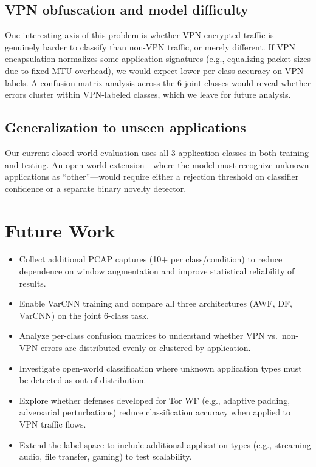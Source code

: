 \documentclass[letterpaper,twocolumn,10pt]{article}
\begin{document}
\subsection{VPN obfuscation and model difficulty}
One interesting axis of this problem is whether VPN-encrypted traffic is genuinely harder to classify than non-VPN traffic, or merely different. If VPN encapsulation normalizes some application signatures (e.g., equalizing packet sizes due to fixed MTU overhead), we would expect lower per-class accuracy on VPN labels. A confusion matrix analysis across the 6 joint classes would reveal whether errors cluster within VPN-labeled classes, which we leave for future analysis.

\subsection{Generalization to unseen applications}
Our current closed-world evaluation uses all 3 application classes in both training and testing. An open-world extension---where the model must recognize unknown applications as ``other''---would require either a rejection threshold on classifier confidence or a separate binary novelty detector.

\section{Future Work}
\begin{itemize}[leftmargin=1.2em]
  \item Collect additional PCAP captures (10+ per class/condition) to reduce dependence on window augmentation and improve statistical reliability of results.
  \item Enable VarCNN training and compare all three architectures (AWF, DF, VarCNN) on the joint 6-class task.
  \item Analyze per-class confusion matrices to understand whether VPN vs.\ non-VPN errors are distributed evenly or clustered by application.
  \item Investigate open-world classification where unknown application types must be detected as out-of-distribution.
  \item Explore whether defenses developed for Tor WF (e.g., adaptive padding, adversarial perturbations) reduce classification accuracy when applied to VPN traffic flows.
  \item Extend the label space to include additional application types (e.g., streaming audio, file transfer, gaming) to test scalability.
\end{itemize}
\end{document}
